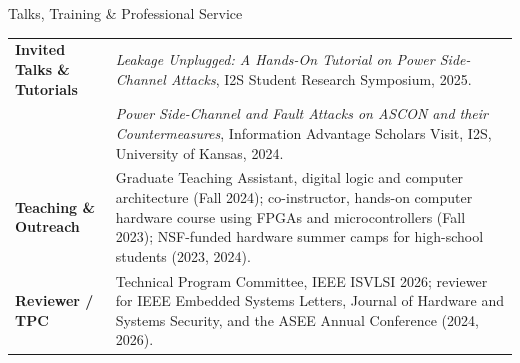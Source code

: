 \begin{rSection}{Talks, Training \& Professional Service}

\begin{tabularx}{\textwidth}{@{}>{\leavevmode\color{accent}\bfseries}p{5.1cm} X@{}}
    Invited Talks \& Tutorials & \emph{Leakage Unplugged: A Hands-On Tutorial on Power Side-Channel Attacks}, I2S Student Research Symposium, 2025. \\
    & \emph{Power Side-Channel and Fault Attacks on ASCON and their Countermeasures}, Information Advantage Scholars Visit, I2S, University of Kansas, 2024. \\[0.15em]
    Teaching \& Outreach & Graduate Teaching Assistant, digital logic and computer architecture (Fall 2024); co-instructor, hands-on computer hardware course using FPGAs and microcontrollers (Fall 2023); NSF-funded hardware summer camps for high-school students (2023, 2024). \\[0.15em]
    Reviewer / TPC & Technical Program Committee, IEEE ISVLSI 2026; reviewer for IEEE Embedded Systems Letters, Journal of Hardware and Systems Security, and the ASEE Annual Conference (2024, 2026). \\
\end{tabularx}

\end{rSection}
